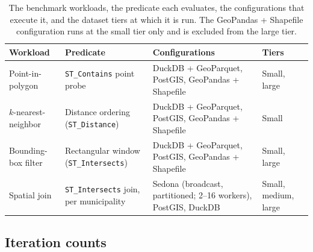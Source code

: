 \begin{table}[H]
    \centering
    \footnotesize
    \setlength{\tabcolsep}{6pt}
    \renewcommand{\arraystretch}{1.2}
    \caption[Benchmark workloads]{The benchmark workloads, the predicate each evaluates, the configurations that execute it, and the dataset tiers at which it is run. The GeoPandas + Shapefile configuration runs at the small tier only and is excluded from the large tier.}
    \label{tab:workload-matrix}
    \begin{tabularx}{\textwidth}{@{}l >{\raggedright\arraybackslash}X >{\raggedright\arraybackslash}X l@{}}
        \toprule
        \textbf{Workload} & \textbf{Predicate} & \textbf{Configurations} & \textbf{Tiers} \\
        \midrule
        Point-in-polygon     & \texttt{ST\_Contains} point probe              & DuckDB + GeoParquet, PostGIS, GeoPandas + Shapefile & Small, large \\
        $k$-nearest-neighbor & Distance ordering (\texttt{ST\_Distance})      & DuckDB + GeoParquet, PostGIS, GeoPandas + Shapefile & Small \\
        Bounding-box filter  & Rectangular window (\texttt{ST\_Intersects})   & DuckDB + GeoParquet, PostGIS, GeoPandas + Shapefile & Small, large \\
        \midrule
        Spatial join         & \texttt{ST\_Intersects} join, per municipality & Sedona (broadcast, partitioned; \numrange{2}{16} workers), PostGIS, DuckDB       & Small, medium, large \\
        \bottomrule
    \end{tabularx}
\end{table}

\subsection{Iteration counts}
\label{research-design-and-methodology:workloads:iteration-counts}

